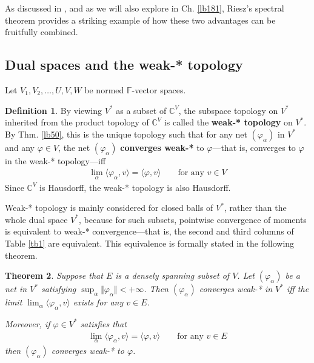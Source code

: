 \documentclass[12pt,b5paper,notitlepage]{article}
\theoremstyle{definition}
\newtheorem{df}{Definition}[section]
\theoremstyle{plain}
\newtheorem{thm}[df]{Theorem}
\newcommand{\bk}[1]{\langle {#1}\rangle}
\newcommand{\Cbb}{\mathbb C}
\newcommand{\Fbb}{\mathbb F}
\numberwithin{equation}{section}
\begin{document}
As discussed in \cite[Sec. 25.8, 25.9]{Gui-A}, and as we will also explore in Ch. \ref{lb181}, Riesz’s spectral theorem provides a striking example of how these two advantages can be fruitfully combined.



\subsection{Dual spaces and the weak-* topology}


Let $V_1,V_2,\dots,U,V,W$ be normed $\Fbb$-vector spaces.


\begin{df}
By viewing $V^*$ as a subset of $\Cbb^V$, the subspace topology on $V^*$ inherited from the product topology of $\Cbb^V$ is called the \textbf{weak-* topology}  on $V^*$. By Thm. \ref{lb50}, this is the unique topology such that for any net $(\varphi_\alpha)$ in $V^*$ and any $\varphi\in V$, the net $(\varphi_\alpha)$ \textbf{converges weak-*}  to $\varphi$---that is, converges to $\varphi$ in the weak-* topology---iff 
\begin{align}\label{eq49}
\lim_\alpha\bk{\varphi_\alpha,v}=\bk{\varphi,v}\qquad\text{for any }v\in V
\end{align}
Since $\Cbb^V$ is Hausdorff, the weak-* topology is also Hausdorff.
\end{df}



Weak-* topology is mainly considered for closed balls of $V^*$, rather than the whole dual space $V^*$, because for such subsets, pointwise convergence of moments is equivalent to weak-* convergence---that is, the second and third columns of Table \ref{tb1} are equivalent. This equivalence is formally stated in the following theorem.

\begin{thm}\label{lb80}
Suppose that $E$ is a densely spanning subset of $V$. Let $(\varphi_\alpha)$ be a net in $V^*$ satisfying $\sup_\alpha\Vert\varphi_\alpha\Vert<+\infty$. Then $(\varphi_\alpha)$ converges weak-* in $V^*$ iff the limit $\lim_\alpha\bk{\varphi_\alpha,v}$ exists for any $v\in E$. 

Moreover, if  $\varphi\in V^*$ satisfies that
\begin{align*}
\lim_\alpha\bk{\varphi_\alpha,v}=\bk{\varphi,v}\qquad\text{for any }v\in E
\end{align*}
then $(\varphi_\alpha)$ converges weak-* to $\varphi$.
\end{thm}
\end{document}
